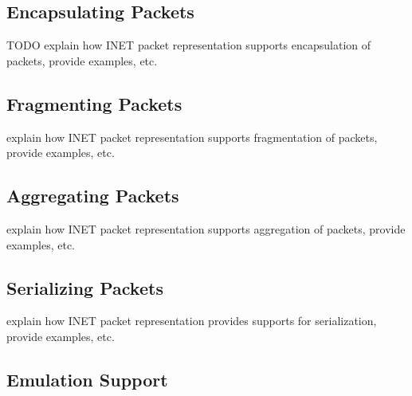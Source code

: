 \subsection{Encapsulating Packets}

TODO explain how INET packet representation supports encapsulation of packets, provide examples, etc.



\subsection{Fragmenting Packets}

explain how INET packet representation supports fragmentation of packets, provide examples, etc.



\subsection{Aggregating Packets}

explain how INET packet representation supports aggregation of packets, provide examples, etc.



\subsection{Serializing Packets}

explain how INET packet representation provides supports for serialization, provide examples, etc.




\subsection{Emulation Support}

